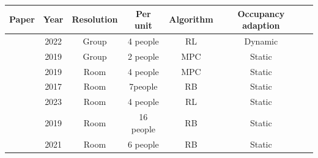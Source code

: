 \begin{tabular}{|l|c|c|c|c|c|c|}
\hline
\textbf{Paper} & \textbf{Year} & \textbf{Resolution} & \textbf{Per unit} & \textbf{Algorithm} & \textbf{Occupancy adaption} \\
\hline
\cite{lei_practical_2022} & 2022 & Group & 4 people& RL & Dynamic  \\
\cite{lee_implementation_2019} & 2019 & Group & 2 people & MPC & Static \\
\cite{li_indoor_2019} & 2019 & Room & 4 people & MPC & Static \\
\cite{li_personalized_2017} & 2017 & Room & 7people & RB & Static \\
\cite{li_indoor_2023} & 2023 & Room & 4 people & RL & Static \\
\cite{aguilera_thermal_2019} & 2019 & Room & 16 people & RB & Static \\
\cite{li_experimental_2021} & 2021 & Room & 6 people & RB & Static \\
\hline
\end{tabular}